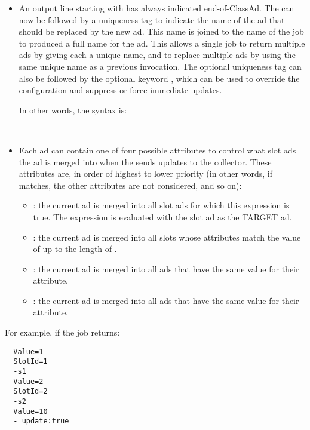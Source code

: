\begin{itemize}

\item An output line starting with 
has always indicated end-of-ClassAd.  The  can now be
followed by a uniqueness tag to indicate the name of the ad that
should be replaced by the new ad.  This name is joined to the name
of the  job to produced a full name for the ad.
This allows a single  job to return multiple
ads by giving each a unique name, and to replace multiple ads by
using the same unique name as a previous invocation. The optional
uniqueness tag can also be followed by the optional keyword
, which can be used to override the
 configuration and suppress or force immediate
updates.

In other words, the syntax is:

-  

\item Each ad can contain one of four possible attributes to control
what slot ads the ad is merged into when the  sends
updates to the collector.  These attributes are, in order of highest
to lower priority (in other words, if 
matches, the other attributes are not considered, and so on):
  \begin{itemize}
  \item {}: the current ad is merged
  into all slot ads for which this expression is true. The expression
  is evaluated with the slot ad as the TARGET ad.
  \item {}: the current ad is merged into all slots
  whose  attributes match the value of 
  up to the length of .
  \item {}: the current ad is merged into all ads
  that have the same value for their  attribute.
  \item {}: the current ad is merged into all ads
  that have the same value for their  attribute. 
  \end{itemize}

\end{itemize}

For example, if the  job returns:

\begin{verbatim}
  Value=1
  SlotId=1
  -s1
  Value=2
  SlotId=2
  -s2
  Value=10
  - update:true
\end{verbatim}

